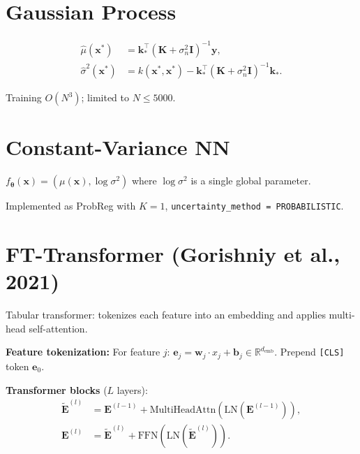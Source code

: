 \documentclass[11pt,a4paper]{article}
\theoremstyle{definition}
\newcommand{\R}{\mathbb{R}}
\newcommand{\bx}{\mathbf{x}}
\newcommand{\by}{\mathbf{y}}
\newcommand{\bw}{\mathbf{w}}
\newcommand{\bK}{\mathbf{K}}
\newcommand{\bI}{\mathbf{I}}
\newcommand{\btheta}{\boldsymbol{\theta}}
\begin{document}
\section{Gaussian Process}

\begin{align}
  \hat{\mu}(\bx^*) &= \mathbf{k}_*^\top (\bK + \sigma_n^2 \bI)^{-1} \by, \\
  \hat{\sigma}^2(\bx^*) &= k(\bx^*, \bx^*) - \mathbf{k}_*^\top (\bK + \sigma_n^2 \bI)^{-1} \mathbf{k}_*.
\end{align}

Training $O(N^3)$; limited to $N \leq 5000$.

\section{Constant-Variance NN}

$f_\btheta(\bx) = (\mu(\bx), \log\sigma^2)$ where $\log\sigma^2$ is a
single global parameter.

\begin{implnote}
Implemented as ProbReg with $K = 1$, \texttt{uncertainty\_method = PROBABILISTIC}.
\end{implnote}

\section{FT-Transformer (Gorishniy et al., 2021)}

Tabular transformer: tokenizes each feature into an embedding and applies
multi-head self-attention.

\textbf{Feature tokenization:} For feature $j$:
$\mathbf{e}_j = \bw_j \cdot x_j + \mathbf{b}_j \in \R^{d_{\mathrm{emb}}}$.
Prepend \texttt{[CLS]} token $\mathbf{e}_0$.

\textbf{Transformer blocks} ($L$ layers):
\begin{align}
  \tilde{\mathbf{E}}^{(l)} &= \mathbf{E}^{(l-1)} + \mathrm{MultiHeadAttn}(\mathrm{LN}(\mathbf{E}^{(l-1)})), \\
  \mathbf{E}^{(l)} &= \tilde{\mathbf{E}}^{(l)} + \mathrm{FFN}(\mathrm{LN}(\tilde{\mathbf{E}}^{(l)})).
\end{align}
\end{document}
